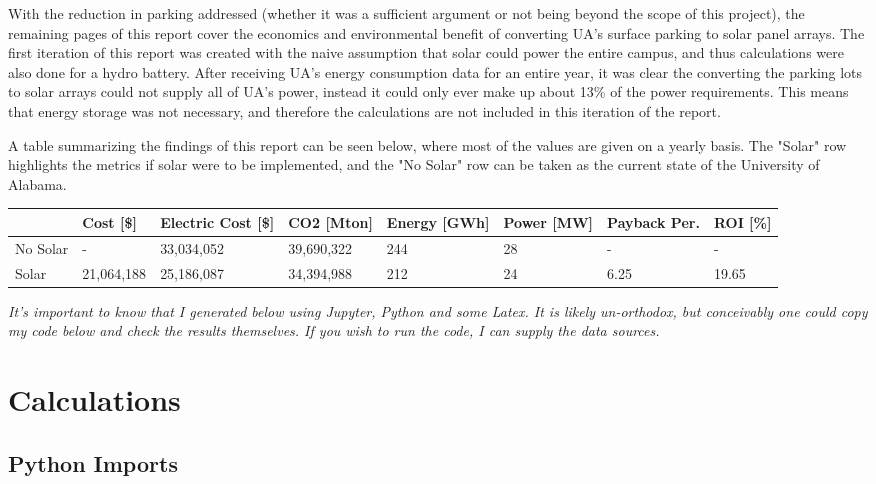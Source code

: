 \documentclass[11pt]{article}
\begin{document}
With the reduction in parking addressed (whether it was a sufficient
argument or not being beyond the scope of this project), the remaining
pages of this report cover the economics and environmental benefit of
converting UA's surface parking to solar panel arrays. The first
iteration of this report was created with the naive assumption that
solar could power the entire campus, and thus calculations were also
done for a hydro battery. After receiving UA's energy consumption data
for an entire year, it was clear the converting the parking lots to
solar arrays could not supply all of UA's power, instead it could only
ever make up about 13\% of the power requirements. This means that
energy storage was not necessary, and therefore the calculations are not
included in this iteration of the report.

A table summarizing the findings of this report can be seen below, where most of the values are given on a yearly basis. The "Solar" row highlights the metrics if solar were to be implemented, and the "No Solar" row can be taken as the current state of the University of Alabama.

{\footnotesize
\begin{tabular}{llllllll}
\toprule
{} &    Cost [\$] & Electric Cost [\$] & CO2 [Mton] & Energy [GWh] & Power [MW] & Payback Per. &    ROI [\%] \\
\midrule
No Solar &           - &               33,034,052 &        39,690,322 &                          244 &                         28 &              - &          - \\
Solar    &  21,064,188 &               25,186,087 &        34,394,988 &                          212 &                         24 &           6.25 &  19.65 \\
\bottomrule
\end{tabular}
}

\emph{It's important to know that I generated below using Jupyter, Python and some Latex. It is likely un-orthodox, but conceivably one could copy my code below and check the results themselves. If you wish to run the code, I can supply the data sources.}

\hypertarget{calculations}{%
\section{Calculations}\label{calculations}}

\hypertarget{python-imports}{%
\subsection{Python Imports}\label{python-imports}}
\end{document}
